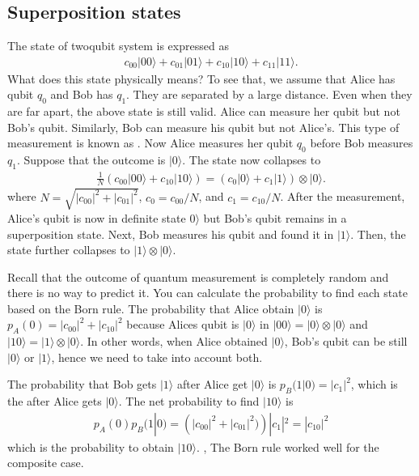 \documentclass[letterpaper,10pt,english]{jupyterBook}
\begin{document}
\subsection{Superposition states}
\label{\detokenize{composites/2qubit:superposition-states}}
\sphinxAtStartPar
The state of two\sphinxhyphen{}qubit system is expressed as
\begin{equation*}
\begin{split}
c_{00} |00\rangle + c_{01} |01\rangle + c_{10} |10\rangle + c_{11} |11\rangle.
\end{split}
\end{equation*}
\sphinxAtStartPar
What does this state physically means?  To see that, we assume that Alice has qubit \(q_0\) and Bob has \(q_1\).  They are separated by a large distance.  Even when they are far apart, the above state is still valid. Alice can measure her qubit but not Bob’s qubit.  Similarly, Bob can measure his qubit but not Alice’s.  This type of measurement is known as .  Now Alice measures her qubit \(q_0\) before Bob measures \(q_1\).  Suppose that the outcome is \(|0\rangle\).  The state now collapses to
\begin{equation*}
\begin{split}
\frac{1}{N} (c_{00} |00\rangle + c_{10} |10\rangle) = \left(c_0 |0\rangle + c_1|1\rangle\right) \otimes |0\rangle .
\end{split}
\end{equation*}
\sphinxAtStartPar
where \(N = \sqrt{|c_{00}|^2 + |c_{01}|^2}\), \(c_0=c_{00}/N\), and \(c_1=c_{10}/N\).  After the measurement, Alice’s qubit is now in  definite state \(0\rangle\) but Bob’s qubit remains in a superposition state.  Next, Bob measures his qubit and found it in \(|1\rangle\).  Then, the state further collapses to \(|1\rangle \otimes |0\rangle\).

\sphinxAtStartPar
Recall that the outcome of quantum measurement is completely random and there is no way to predict it.  You can calculate the probability to find each state based on the Born rule.  The probability that Alice obtain \(|0\rangle\) is \(p_A(0) = |c_{00}|^2 + |c_{10}|^2\) because Alices qubit is \(|0\rangle\) in \(|00\rangle = |0\rangle \otimes |0\rangle\) and \(|10\rangle = |1\rangle \otimes |0\rangle\). In other words, when Alice obtained \(|0\rangle\), Bob’s qubit can be still \(|0\rangle\) or \(|1\rangle\), hence we need to take into account both.

\sphinxAtStartPar
The probability that Bob gets \(|1\rangle\) after Alice get \(|0\rangle\) is \(p_B(1|0)=|c_1|^2\), which is the  after Alice gets \(|0\rangle\). The net probability to find \(|10\rangle\) is
\begin{equation*}
\begin{split}
p_A(0) p_B(1|0) = \left(|c_{00}|^2 + |c_{01}|^2)\right) |c_1|^2 = |c_{10}|^2
\end{split}
\end{equation*}
\sphinxAtStartPar
which is the probability to obtain \(|10\rangle\).  , The Born rule worked well for the composite case.
\end{document}
